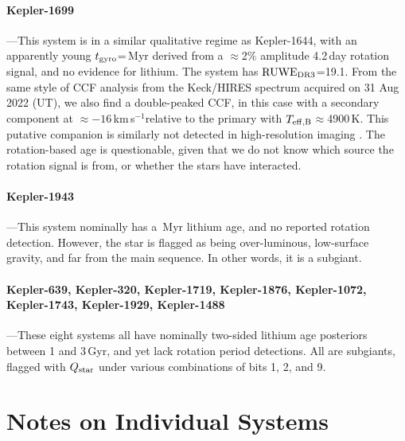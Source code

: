 \documentclass[11pt,twocolumn,tighten]{aastex63}
\newcommand{\kms}{{km\,s$^{-1}$}}
\begin{document}
\paragraph{Kepler-1699}---This system is in a similar qualitative
regime as Kepler-1644, with an apparently young $t_{\rm
gyro}$=\kepsixteenninenine\,Myr derived from a $\approx$2\% amplitude
4.2\,day rotation signal, and no evidence for lithium.  The system has
${\rm RUWE}_{\rm DR3}$=19.1.  From the same style of CCF analysis from
the Keck/HIRES spectrum acquired on 31 Aug 2022 (UT), we also find a
double-peaked CCF, in this case with a secondary component at
$\approx$$-16$\,\kms relative to the primary with $T_{\rm
eff,B}$$\approx$4900\,K.  This putative companion is similarly not
detected in high-resolution imaging \citep{2017AJ....153...66Z}.  The
rotation-based age is questionable, given that we do not know which
source the rotation signal is from, or whether the stars have
interacted.

\paragraph{Kepler-1943}---This system nominally has a
\kepnineteenfourthree\,Myr lithium age, and no reported rotation
detection.  However, the star is flagged as being over-luminous,
low-surface gravity, and far from the main sequence.  In other words,
it is a subgiant.

\paragraph{Kepler-639, Kepler-320, Kepler-1719, Kepler-1876,
Kepler-1072, Kepler-1743, Kepler-1929, Kepler-1488}---These eight
systems all have nominally two-sided lithium age posteriors between 1
and 3\,Gyr, and yet lack rotation period detections.  All are
subgiants, flagged with $Q_{\rm star}$ under various combinations of
bits 1, 2, and 9.


\section{Notes on Individual Systems}

%
\end{document}
